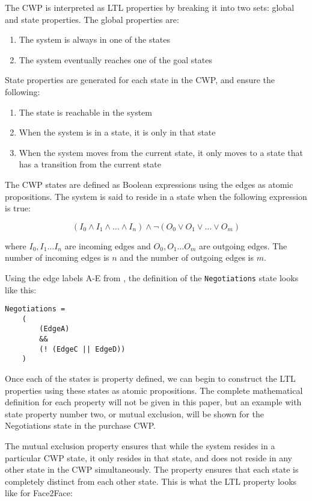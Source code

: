 
The CWP is interpreted as LTL properties by breaking it into two sets: global and state properties. The global properties are:
\begin{enumerate}
    \item The system is always in one of the states
    \item The system eventually reaches one of the goal states
\end{enumerate}

State properties are generated for each state in the CWP, and ensure the following:
\begin{enumerate}
    \item The state is reachable in the system
    \item When the system is in a state, it is only in that state
    \item When the system moves from the current state, it only moves to a state that has a transition from the current state
\end{enumerate}

The CWP states are defined as Boolean expressions using the edges as atomic propositions. The system is said to reside in a state when the following expression is true: 

\[(I_0 \land I_1 \land \ldots \land I_n) \land \neg (O_0 \lor O_1 \lor \ldots \lor O_m)\]

where $I_0, I_1 \ldots I_n$ are incoming edges and $O_0, O_1 \ldots O_m$ are outgoing edges. The number of incoming edges is $n$ and the number of outgoing edges is $m$. 

Using the edge labels A-E from , the definition of the \lstinline[style=myPromela]{Negotiations} state looks like this:

\begin{lstlisting}[style=myPromela]
Negotiations =
    (
        (EdgeA)
        &&
        (! (EdgeC || EdgeD))
    )
\end{lstlisting}

Once each of the states is property defined, we can begin to construct the LTL properties using these states as atomic propositions. The complete mathematical definition for each property will not be given in this paper, but an example with state property number two, or mutual exclusion, will be shown for the Negotiations state in the purchase CWP.

The mutual exclusion property ensures that while the system resides in a particular CWP state, it only resides in that state, and does not reside in any other state in the CWP simultaneously. The property ensures that each state is completely distinct from each other state. This is what the LTL property looks like for Face2Face:

